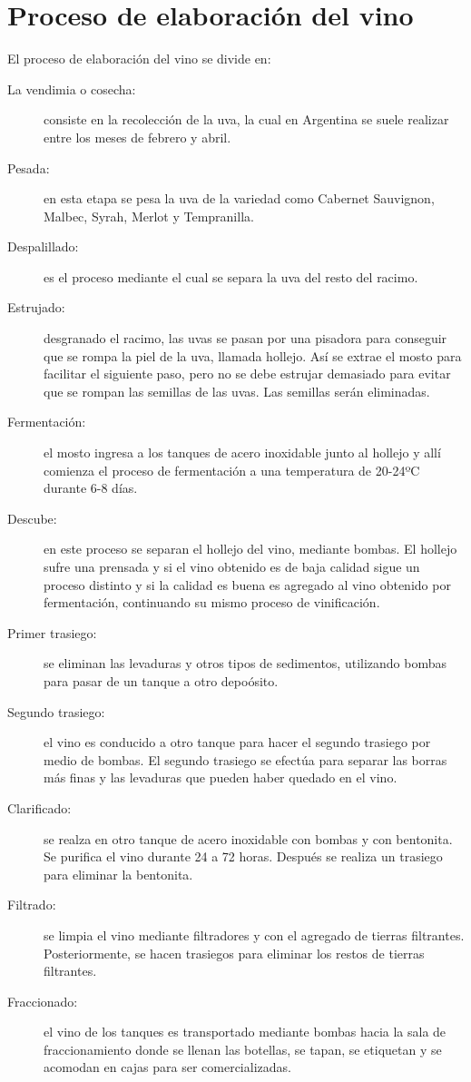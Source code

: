 \section{Proceso de elaboración del vino}
El proceso de elaboración del vino se divide en:
\begin{description}
  \item[La vendimia o cosecha:] consiste en la recolección de la uva, la cual en Argentina se suele realizar entre los meses de febrero y abril.
  \item[Pesada:] en esta etapa se pesa la uva de la variedad como Cabernet Sauvignon, Malbec, Syrah, Merlot y Tempranilla.
  \item[Despalillado:] es el proceso mediante el cual se separa la uva del resto del racimo.
  \item[Estrujado:] desgranado el racimo, las uvas se pasan por una pisadora para conseguir que se rompa la piel de la uva, llamada hollejo. Así se extrae el mosto para facilitar el siguiente paso, pero no se debe estrujar demasiado para evitar que se rompan las semillas de las uvas. Las semillas serán eliminadas.
  \item[Fermentación:] el mosto ingresa a los tanques de acero inoxidable junto al hollejo y allí comienza el proceso de fermentación a una temperatura de 20-24ºC durante 6-8 días.
  \item[Descube:] en este proceso se separan el hollejo del vino, mediante bombas. El hollejo sufre una prensada y si el vino obtenido es de baja calidad sigue un proceso distinto y si la calidad es buena es agregado al vino obtenido por fermentación, continuando su mismo proceso de vinificación.
  \item[Primer trasiego:] se eliminan las levaduras y otros tipos de sedimentos, utilizando bombas para pasar de un tanque a otro depoósito.
  \item[Segundo trasiego:] el vino es conducido a otro tanque para hacer el segundo trasiego por medio de bombas. El segundo trasiego se efectúa para separar las borras más finas y las levaduras que pueden haber quedado en el vino.
  \item[Clarificado:] se realza en otro tanque de acero inoxidable con bombas y con bentonita. Se purifica el vino durante 24 a 72 horas. Después se realiza un trasiego para eliminar la bentonita.
  \item[Filtrado:] se limpia el vino mediante filtradores y con el agregado de tierras filtrantes. Posteriormente, se hacen trasiegos para eliminar los restos de tierras filtrantes.
  \item[Fraccionado:] el vino de los tanques es transportado mediante bombas hacia la sala de fraccionamiento donde se llenan las botellas, se tapan, se etiquetan y se acomodan en cajas para ser comercializadas.
\end{description}

